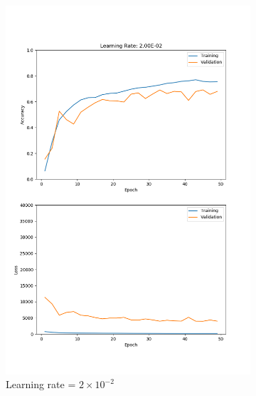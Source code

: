 \documentclass[11pt]{article}
\begin{document}
\begin{figure}[h!]
    \begin{subfigure}{.325\textwidth}
      \centering
      \includegraphics[width=.95\linewidth]{../results/q3_1_2_2E-02.png}
      \caption{Learning rate = $2\times10^{-2}$}
    \end{subfigure}
    \begin{subfigure}{.325\textwidth}
      \centering

\end{subfigure}
\end{figure}
\end{document}
